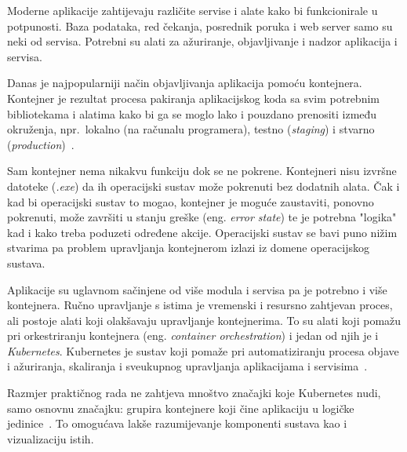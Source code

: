 Moderne aplikacije zahtijevaju različite servise i alate kako bi funkcionirale u potpunosti.
Baza podataka, red čekanja, posrednik poruka i web server samo su neki od servisa.
Potrebni su alati za ažuriranje, objavljivanje i nadzor aplikacija i servisa.

Danas je najpopularniji način objavljivanja aplikacija pomoću kontejnera.
Kontejner je rezultat procesa pakiranja aplikacijskog koda sa svim potrebnim bibliotekama i alatima kako bi ga se moglo
lako i pouzdano prenositi između okruženja, npr.\ lokalno (na računalu programera), testno (\textit{staging}) i
stvarno (\textit{production})~\cite{docker-containers}.

Sam kontejner nema nikakvu funkciju dok se ne pokrene.
Kontejneri nisu izvršne datoteke (\textit{.exe}) da ih operacijski sustav može pokrenuti bez dodatnih alata.
Čak i kad bi operacijski sustav to mogao, kontejner je moguće zaustaviti, ponovno pokrenuti, može završiti u stanju
greške (eng. \textit{error state}) te je potrebna "logika" kad i kako treba poduzeti određene akcije.
Operacijski sustav se bavi puno nižim stvarima pa problem upravljanja kontejnerom izlazi iz domene operacijskog sustava.

Aplikacije su uglavnom sačinjene od više modula i servisa pa je potrebno i više kontejnera.
Ručno upravljanje s istima je vremenski i resursno zahtjevan proces, ali postoje alati koji olakšavaju upravljanje kontejnerima.
To su alati koji pomažu pri orkestriranju kontejnera (eng. \textit{container orchestration}) i jedan od njih je i \textit{Kubernetes}.
Kubernetes je sustav koji pomaže pri automatiziranju procesa objave i ažuriranja, skaliranja i sveukupnog
upravljanja aplikacijama i servisima~\cite{kubernetes}.

Razmjer praktičnog rada ne zahtjeva mnoštvo značajki koje Kubernetes nudi, samo osnovnu značajku:
grupira kontejnere koji čine aplikaciju u logičke jedinice~\cite{kubernetes}.
To omogućava lakše razumijevanje komponenti sustava kao i vizualizaciju istih.

\pagebreak

